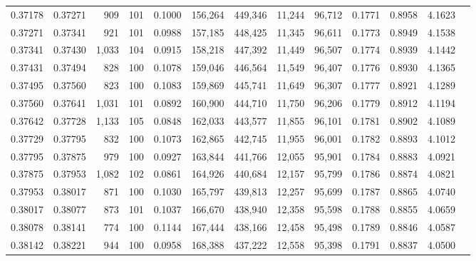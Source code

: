 \begin{tabular}{rrrrrrrrrrrrr}
0.37178 & 0.37271 &   909 & 101 &                                     0.1000 & 156,264 & 449,346 &  11,244 &  96,712 & 0.1771 & 0.8958 & 4.1623 \\
0.37271 & 0.37341 &   921 & 101 &                                     0.0988 & 157,185 & 448,425 &  11,345 &  96,611 & 0.1773 & 0.8949 & 4.1538 \\
0.37341 & 0.37430 & 1,033 & 104 &                                     0.0915 & 158,218 & 447,392 &  11,449 &  96,507 & 0.1774 & 0.8939 & 4.1442 \\
0.37431 & 0.37494 &   828 & 100 &                                     0.1078 & 159,046 & 446,564 &  11,549 &  96,407 & 0.1776 & 0.8930 & 4.1365 \\
0.37495 & 0.37560 &   823 & 100 &                                     0.1083 & 159,869 & 445,741 &  11,649 &  96,307 & 0.1777 & 0.8921 & 4.1289 \\
0.37560 & 0.37641 & 1,031 & 101 &                                     0.0892 & 160,900 & 444,710 &  11,750 &  96,206 & 0.1779 & 0.8912 & 4.1194 \\
0.37642 & 0.37728 & 1,133 & 105 &                                     0.0848 & 162,033 & 443,577 &  11,855 &  96,101 & 0.1781 & 0.8902 & 4.1089 \\
0.37729 & 0.37795 &   832 & 100 &                                     0.1073 & 162,865 & 442,745 &  11,955 &  96,001 & 0.1782 & 0.8893 & 4.1012 \\
0.37795 & 0.37875 &   979 & 100 &                                     0.0927 & 163,844 & 441,766 &  12,055 &  95,901 & 0.1784 & 0.8883 & 4.0921 \\
0.37875 & 0.37953 & 1,082 & 102 &                                     0.0861 & 164,926 & 440,684 &  12,157 &  95,799 & 0.1786 & 0.8874 & 4.0821 \\
0.37953 & 0.38017 &   871 & 100 &                                     0.1030 & 165,797 & 439,813 &  12,257 &  95,699 & 0.1787 & 0.8865 & 4.0740 \\
0.38017 & 0.38077 &   873 & 101 &                                     0.1037 & 166,670 & 438,940 &  12,358 &  95,598 & 0.1788 & 0.8855 & 4.0659 \\
0.38078 & 0.38141 &   774 & 100 &                                     0.1144 & 167,444 & 438,166 &  12,458 &  95,498 & 0.1789 & 0.8846 & 4.0587 \\
0.38142 & 0.38221 &   944 & 100 &                                     0.0958 & 168,388 & 437,222 &  12,558 &  95,398 & 0.1791 & 0.8837 & 4.0500 \\

\end{tabular}
